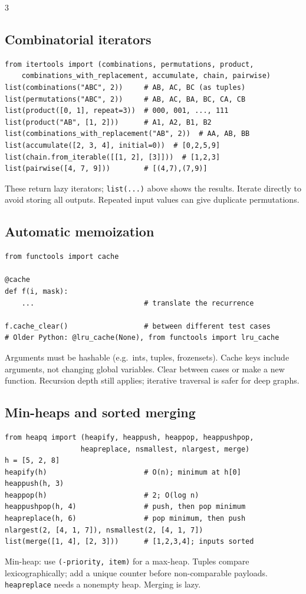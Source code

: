 \documentclass[9pt]{extarticle}
\let\referenceSubsection\subsection
\renewcommand{\subsection}{\needspace{4\baselineskip}\referenceSubsection}
\newcommand{\hint}[1]{{\small #1\par}}
\begin{document}
\begin{multicols*}{3}
\subsection{Combinatorial iterators}
\begin{lstlisting}[label=py:itertools]
from itertools import (combinations, permutations, product,
    combinations_with_replacement, accumulate, chain, pairwise)
list(combinations("ABC", 2))     # AB, AC, BC (as tuples)
list(permutations("ABC", 2))     # AB, AC, BA, BC, CA, CB
list(product([0, 1], repeat=3))  # 000, 001, ..., 111
list(product("AB", [1, 2]))      # A1, A2, B1, B2
list(combinations_with_replacement("AB", 2))  # AA, AB, BB
list(accumulate([2, 3, 4], initial=0))  # [0,2,5,9]
list(chain.from_iterable([[1, 2], [3]]))  # [1,2,3]
list(pairwise([4, 7, 9]))        # [(4,7),(7,9)]
\end{lstlisting}
\hint{These return lazy iterators; \texttt{list(...)} above shows
the results. Iterate directly to avoid storing all outputs.
Repeated input values can give duplicate permutations.}

\subsection{Automatic memoization}
\begin{lstlisting}[label=py:cache]
from functools import cache

@cache
def f(i, mask):
    ...                          # translate the recurrence

f.cache_clear()                  # between different test cases
# Older Python: @lru_cache(None), from functools import lru_cache
\end{lstlisting}
\hint{Arguments must be hashable (e.g.\ ints, tuples, frozensets).
Cache keys include arguments, not changing global variables.
Clear between cases or make a new function. Recursion depth still
applies; iterative traversal is safer for deep graphs.}

\subsection{Min-heaps and sorted merging}
\begin{lstlisting}[label=py:heap]
from heapq import (heapify, heappush, heappop, heappushpop,
                  heapreplace, nsmallest, nlargest, merge)
h = [5, 2, 8]
heapify(h)                       # O(n); minimum at h[0]
heappush(h, 3)
heappop(h)                       # 2; O(log n)
heappushpop(h, 4)                # push, then pop minimum
heapreplace(h, 6)                # pop minimum, then push
nlargest(2, [4, 1, 7]), nsmallest(2, [4, 1, 7])
list(merge([1, 4], [2, 3]))      # [1,2,3,4]; inputs sorted
\end{lstlisting}
\hint{Min-heap: use \texttt{(-priority, item)} for a max-heap.
Tuples compare lexicographically; add a unique counter before
non-comparable payloads. \texttt{heapreplace} needs a nonempty
heap. Merging is lazy.}


\end{multicols*}
\end{document}
